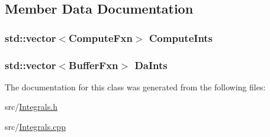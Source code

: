 \subsection{Member Data Documentation}
\hypertarget{classJKBuilder_1_1Integrals_a968679304a6d15dd63858873608113b5}{
\subsubsection[{ComputeInts}]{\setlength{\rightskip}{0pt plus 5cm}std::vector$<${\bf ComputeFxn}$>$ {\bf ComputeInts}}}
\label{classJKBuilder_1_1Integrals_a968679304a6d15dd63858873608113b5}
\hypertarget{classJKBuilder_1_1Integrals_a877ca0c4fd4342f3d3ca7078e65fbfeb}{
\subsubsection[{DaInts}]{\setlength{\rightskip}{0pt plus 5cm}std::vector$<${\bf BufferFxn}$>$ {\bf DaInts}}}
\label{classJKBuilder_1_1Integrals_a877ca0c4fd4342f3d3ca7078e65fbfeb}


The documentation for this class was generated from the following files:\begin{DoxyCompactItemize}
\item 
src/\hyperlink{Integrals_8h}{Integrals.h}\item 
src/\hyperlink{Integrals_8cpp}{Integrals.cpp}\end{DoxyCompactItemize}
